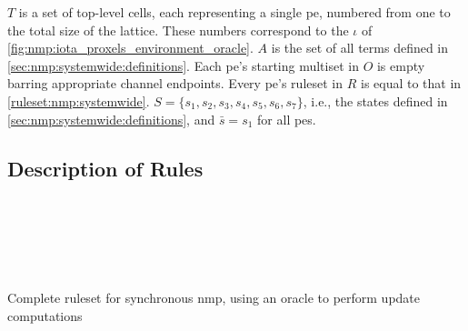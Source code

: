 \(T\) is a set of top-level cells, each representing a single \gls{pe}, numbered from one to the total size of the lattice.  These numbers correspond to the \(\iota\) of \autoref{fig:nmp:iota_proxels_environment_oracle}.  \(A\) is the set of all terms defined in \autoref{sec:nmp:systemwide:definitions}.  Each \gls{pe}'s starting multiset in \(O\) is empty barring appropriate channel endpoints.  Every \gls{pe}'s ruleset in \(R\) is equal to that in \autoref{ruleset:nmp:systemwide}.  \(S = \{s_1, s_2, s_3, s_4, s_5, s_6, s_7\}\), i.e., the states defined in \autoref{sec:nmp:systemwide:definitions}, and \(\bar{s} = s_1\) for all \glspl{pe}.

\subsection{Description of Rules}

\begin{cprulesetfloat}
    \begin{cpruleset}
        
        
        \\
        
        
        
        
        
        \\
        
        
        \\
        
        
        
    \end{cpruleset}
    \caption[Complete ruleset for synchronous \acrlong{nmp}]{\label{ruleset:nmp:systemwide}Complete ruleset for synchronous \gls{nmp}, using an oracle to perform update computations}
\end{cprulesetfloat}

